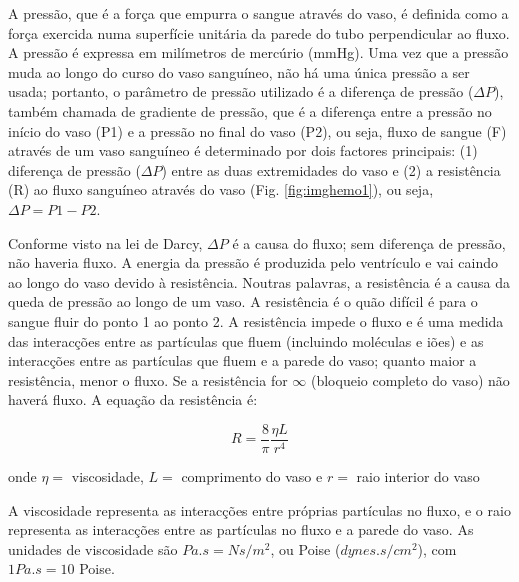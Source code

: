 \documentclass[
  portuguese,
  ]{book}
\begin{document}
A pressão, que é a força que empurra o sangue através do vaso, é definida como a força exercida numa superfície unitária da parede do tubo perpendicular ao fluxo. A pressão é expressa em milímetros de mercúrio (mmHg). Uma vez que a pressão muda ao longo do curso do vaso sanguíneo, não há uma única pressão a ser usada; portanto, o parâmetro de pressão utilizado é a diferença de pressão (\(\Delta P\)), também chamada de gradiente de pressão, que é a diferença entre a pressão no início do vaso (P1) e a pressão no final do vaso (P2), ou seja, fluxo de sangue (F) através de um vaso sanguíneo é determinado por dois factores principais: (1) diferença de pressão (\(\Delta P\)) entre as duas extremidades do vaso e (2) a resistência (R) ao fluxo sanguíneo através do vaso (Fig. \ref{fig:imghemo1}), ou seja, \(\Delta P = P1 - P2\).

Conforme visto na lei de Darcy, \(\Delta P\) é a causa do fluxo; sem diferença de pressão, não haveria fluxo. A energia da pressão é produzida pelo ventrículo e vai caindo ao longo do vaso devido à resistência. Noutras palavras, a resistência é a causa da queda de pressão ao longo de um vaso.
A resistência é o quão difícil é para o sangue fluir do ponto 1 ao ponto 2. A resistência impede o fluxo e é uma medida das interacções entre as partículas que fluem (incluindo moléculas e iões) e as interacções entre as partículas que fluem e a parede do vaso; quanto maior a resistência, menor o fluxo. Se a resistência for \(\infty\) (bloqueio completo do vaso) não haverá fluxo. A equação da resistência é:

\begin{equation}
R=\frac{8}{\pi}\frac{\eta L}{r^4}
\label{eq:resis}
\end{equation}

onde \(\eta=\) viscosidade, \(L=\) comprimento do vaso e \(r=\) raio interior do vaso

A viscosidade representa as interacções entre próprias partículas no fluxo, e o raio representa as interacções entre as partículas no fluxo e a parede do vaso. As unidades de viscosidade são \(Pa.s = Ns / m^2\), ou Poise (\(dynes.s / cm^2\)), com \(1 Pa.s = 10\) Poise.
\end{document}
